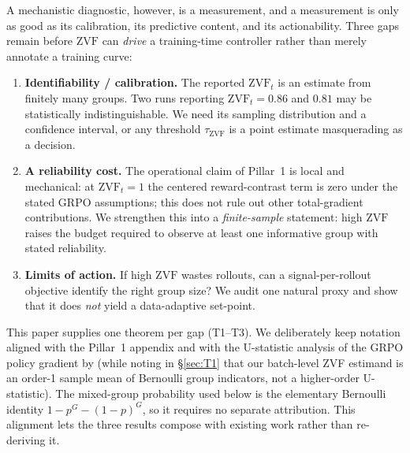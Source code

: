 \documentclass[11pt]{article}
\theoremstyle{plain}
\theoremstyle{definition}
\theoremstyle{remark}
\newcommand{\ZVF}{\ensuremath{\mathrm{ZVF}}}
\newcommand{\1}{\mathbb{1}}
\begin{document}
A mechanistic diagnostic, however, is a measurement, and a measurement is only
as good as its calibration, its predictive content, and its actionability.
Three gaps remain before \ZVF{} can \emph{drive} a training-time controller
rather than merely annotate a training curve:

\begin{enumerate}[leftmargin=1.5em,itemsep=2pt]
  \item \textbf{Identifiability / calibration.} The reported $\ZVF_t$ is an
        estimate from finitely many groups. Two runs reporting
        $\ZVF_t = 0.86$ and $0.81$ may be statistically indistinguishable. We
        need its sampling distribution and a confidence interval, or any
        threshold $\tau_{\ZVF}$ is a point estimate masquerading as a decision.
  \item \textbf{A reliability cost.} The operational claim of Pillar~1 is local
        and mechanical: at $\ZVF_t = 1$ the centered reward-contrast term is
        zero under the stated GRPO assumptions; this does not rule out other
        total-gradient contributions. We strengthen this
        into a \emph{finite-sample} statement: high \ZVF{} raises the budget
        required to observe at least one informative group with stated reliability.
  \item \textbf{Limits of action.} If high \ZVF{} wastes rollouts, can a
        signal-per-rollout objective identify the right group size? We audit one
        natural proxy and show that it does \emph{not} yield a data-adaptive
        set-point.
\end{enumerate}

This paper supplies one theorem per gap (T1--T3). We deliberately keep
notation aligned with the Pillar~1 appendix and with the U-statistic analysis
of the GRPO policy gradient by \citet{zhou2026demystifyinggrpo} (while noting in
\S\ref{sec:T1} that our batch-level ZVF estimand is an order-1 sample mean of
Bernoulli group indicators, not a higher-order U-statistic). The mixed-group probability used below is
the elementary Bernoulli identity $1-p^G-(1-p)^G$, so it requires no separate
attribution. This alignment lets the three results compose with existing work
rather than re-deriving it.
\end{document}
